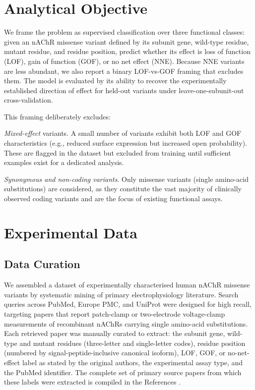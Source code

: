 \documentclass{ws-procs11x85}
\begin{document}
\section{Analytical Objective}\label{sec:objective}

We frame the problem as supervised classification over three functional
classes: given an nAChR missense variant defined by its subunit gene,
wild-type residue, mutant residue, and residue position, predict whether
its effect is loss of function (LOF), gain of function (GOF), or no net
effect (NNE). Because NNE variants are less abundant, we also report a
binary LOF-vs-GOF framing that excludes them. The model is evaluated by
its ability to recover the experimentally established direction of
effect for held-out variants under leave-one-subunit-out
cross-validation.

This framing deliberately excludes:
\begin{itemlist}
\item \emph{Mixed-effect} variants. A small number of variants exhibit
  both LOF and GOF characteristics (e.g., reduced surface expression
  but increased open probability). These are flagged in the dataset
  but excluded from training until sufficient examples exist for a
  dedicated analysis.
\item \emph{Synonymous and non-coding variants}. Only missense variants
  (single amino-acid substitutions) are considered, as they constitute
  the vast majority of clinically observed coding variants and are the
  focus of existing functional assays.
\end{itemlist}

\section{Experimental Data}\label{sec:data}

\subsection{Data Curation}

We assembled a dataset of experimentally characterised human nAChR
missense variants by systematic mining of primary electrophysiology
literature. Search queries across PubMed, Europe PMC, and UniProt
were designed for high recall, targeting papers that report patch-clamp
or two-electrode voltage-clamp measurements of recombinant nAChRs
carrying single amino-acid substitutions. Each retrieved paper was
manually curated to extract: the subunit gene, wild-type and mutant
residues (three-letter and single-letter codes), residue position
(numbered by signal-peptide-inclusive canonical isoform), LOF, GOF, or
no-net-effect label as stated by the original authors, the experimental
assay type, and the PubMed identifier. The complete set of primary
source papers from which these labels were extracted is compiled in the
References \cite{mohanraj2026}.
\end{document}
